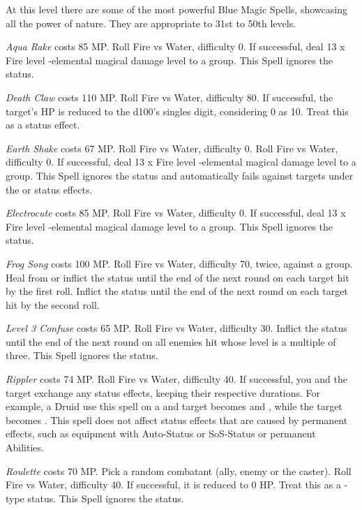\begin{multicols}{2}
	At this level there are some of the most powerful Blue Magic Spells, showcasing all the power of nature. They are appropriate to 31st to 50th levels.

    \textit{Aqua Rake} costs 85 MP\@. Roll Fire vs Water, difficulty 0. If successful, deal 13 x Fire level -elemental magical damage level to a group. This Spell ignores the  status.

    \textit{Death Claw} costs 110 MP\@. Roll Fire vs Water, difficulty 80. If successful, the target's HP is reduced to the d100’s singles digit, considering 0 as 10. Treat this as a  status effect.
    
    \textit{Earth Shake} costs 67 MP\@. Roll Fire vs Water, difficulty 0. Roll Fire vs Water, difficulty 0. If successful, deal 13 x Fire level -elemental magical damage level to a group. This Spell ignores the  status and automatically fails against targets under the  or  status effects.
    
    \textit{Electrocute} costs 85 MP\@. Roll Fire vs Water, difficulty 0. If successful, deal 13 x Fire level -elemental magical damage level to a group. This Spell ignores the  status.
    
    \textit{Frog Song} costs 100 MP\@. Roll Fire vs Water, difficulty 70, twice, against a group. Heal from or inflict the  status until the end of the next round on each target hit by the first roll. Inflict the  status until the end of the next round on each target hit by the second roll.
    
    \textit{Level 3 Confuse} costs 65 MP\@. Roll Fire vs Water, difficulty 30. Inflict the  status until the end of the next round on all enemies hit whose level is a multiple of three. This Spell ignores the  status.
    
    \textit{Rippler} costs 74 MP\@. Roll Fire vs Water, difficulty 40. If successful, you and the target exchange any status effects, keeping their respective durations. For example, a  Druid use this spell on a  and  target becomes  and , while the target becomes . This spell does not affect status effects that are caused by permanent effects, such as equipment with Auto-Status or SoS-Status or permanent Abilities.
    
    \textit{Roulette} costs 70 MP\@. Pick a random combatant (ally, enemy or the caster). Roll Fire vs Water, difficulty 40. If successful, it is reduced to 0 HP\@. Treat this as a -type status. This Spell ignores the  status.
    

\end{multicols}

